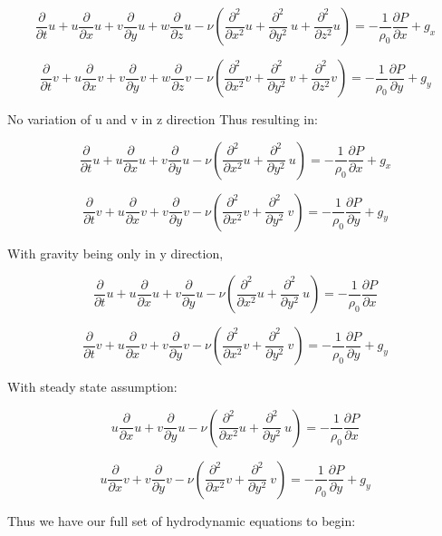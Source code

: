\documentclass[11pt]{article}
\begin{document}
$$\frac{\partial }{\partial t} u + u \frac{\partial}{\partial x} u + v \frac{\partial}{\partial y} u + w \frac{\partial}{\partial z} u - \nu ( \frac{\partial^2}{\partial x^2} u + \frac{\partial^2}{\partial y^2} \ u + \frac{\partial^2}{\partial z^2} u) = - \frac{1}{\rho_0} \frac{\partial P}{\partial x} +g_x$$

$$\frac{\partial }{\partial t} v + u \frac{\partial}{\partial x} v + v \frac{\partial}{\partial y} v + w \frac{\partial}{\partial z} v - \nu ( \frac{\partial^2}{\partial x^2} v + \frac{\partial^2}{\partial y^2} \ v + \frac{\partial^2}{\partial z^2} v) = - \frac{1}{\rho_0} \frac{\partial P}{\partial y} +g_y$$

No variation of u and v in z direction
Thus resulting in:

$$\frac{\partial }{\partial t} u + u \frac{\partial}{\partial x} u + v \frac{\partial}{\partial y} u  - \nu ( \frac{\partial^2}{\partial x^2} u + \frac{\partial^2}{\partial y^2} \ u ) = - \frac{1}{\rho_0} \frac{\partial P}{\partial x} +g_x$$

$$\frac{\partial }{\partial t} v + u \frac{\partial}{\partial x} v + v \frac{\partial}{\partial y} v  - \nu ( \frac{\partial^2}{\partial x^2} v + \frac{\partial^2}{\partial y^2} \ v ) = - \frac{1}{\rho_0} \frac{\partial P}{\partial y} +g_y$$

With gravity being only in y direction,

$$\frac{\partial }{\partial t} u + u \frac{\partial}{\partial x} u + v \frac{\partial}{\partial y} u  - \nu ( \frac{\partial^2}{\partial x^2} u + \frac{\partial^2}{\partial y^2} \ u ) = - \frac{1}{\rho_0} \frac{\partial P}{\partial x} $$

$$\frac{\partial }{\partial t} v + u \frac{\partial}{\partial x} v + v \frac{\partial}{\partial y} v  - \nu ( \frac{\partial^2}{\partial x^2} v + \frac{\partial^2}{\partial y^2} \ v ) = - \frac{1}{\rho_0} \frac{\partial P}{\partial y} +g_y$$

With steady state assumption:

$$ u \frac{\partial}{\partial x} u + v \frac{\partial}{\partial y} u  - \nu ( \frac{\partial^2}{\partial x^2} u + \frac{\partial^2}{\partial y^2} \ u ) = - \frac{1}{\rho_0} \frac{\partial P}{\partial x} $$

$$ u \frac{\partial}{\partial x} v + v \frac{\partial}{\partial y} v  - \nu ( \frac{\partial^2}{\partial x^2} v + \frac{\partial^2}{\partial y^2} \ v ) = - \frac{1}{\rho_0} \frac{\partial P}{\partial y} +g_y$$


Thus we have our full set of hydrodynamic equations to begin:
\end{document}
